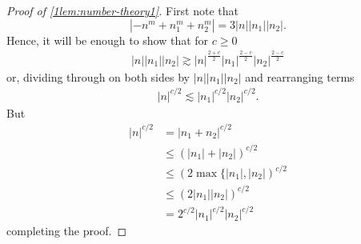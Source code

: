 %
%
%
%
%
%
\begin{proof}[Proof of \cref{1lem:number-theory1}]
First note that
%
\begin{equation*}
		| - n^m + n_1^m + n_2^m|
		 = 3 | n | |n_1 | |n_2 |.
\end{equation*}
%
%
Hence, it will be enough to show that for $c \ge 0$
%
%
\begin{equation*}
	\begin{split}
		| n | |n_1 | |n_2 | \gtrsim | n |^{\frac{2 + c}{2}}| n_1
		|^{\frac{2-c}{2}}| n_2 |^{\frac{2-c}{2}}
	\end{split}
\end{equation*}
%
%
or, dividing through on both sides by $|n| | n_1 | | n_2 |$ and rearranging terms
%
%
\begin{equation*}
	\begin{split}
		| n |^{c/2} \lesssim | n_1 |^{c/2} | n_2 |^{c/2}.
	\end{split}
\end{equation*}
%
%
But
%
%
\begin{equation*}
	\begin{split}
		| n |^{c/2} &= | n_1 + n_2 |^{c/2}
		\\
		& \le (| n_1 | + |n_2|)^{c/2} 
		\\
		& \le (2\max\{|
		n_1 |, | n_2 |)^{c/2}
		\\
		& \le (2|
		n_1 | | n_2 |)^{c/2}
		\\
		& = 2^{c/2} | n_1 |^{c/2} | n_2 |^{c/2}
	\end{split}
\end{equation*}
completing the proof.
\end{proof}

